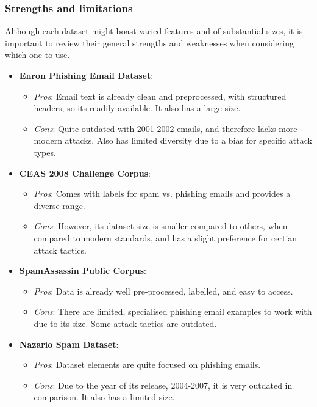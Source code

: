 
\subsubsection*{Strengths and limitations}
Although each dataset might boast varied features and of substantial sizes, it is important to review their general strengths and weaknesses when considering which one to use.

\begin{itemize}
  \item \textbf{Enron Phishing Email Dataset}:
  \begin{itemize}
    \item \textit{Pros}: Email text is already clean and preprocessed, with structured headers, so its readily available. It also has a large size.
    \item \textit{Cons}: Quite outdated with 2001-2002 emails, and therefore lacks more modern attacks. Also has limited diversity due to a bias for specific attack types.
  \end{itemize}
  \item \textbf{CEAS 2008 Challenge Corpus}:
  \begin{itemize}
    \item \textit{Pros}: Comes with labels for spam vs. phishing emails and provides a diverse range.
    \item \textit{Cons}: However, its dataset size is smaller compared to others, when compared to modern standards, and has a slight preference for certian attack tactics.
  \end{itemize}
  \item \textbf{SpamAssassin Public Corpus}:
  \begin{itemize}
    \item \textit{Pros}: Data is already well pre-processed, labelled, and easy to access.
    \item \textit{Cons}: There are limited, specialised phishing email examples to work with due to its size. Some attack tactics are outdated.
  \end{itemize}
  \item \textbf{Nazario Spam Dataset}:
  \begin{itemize}
    \item \textit{Pros}: Dataset elements are quite focused on phishing emails.
    \item \textit{Cons}: Due to the year of its release, 2004-2007, it is very outdated in comparison. It also has a limited size.

\end{itemize}
\end{itemize}
